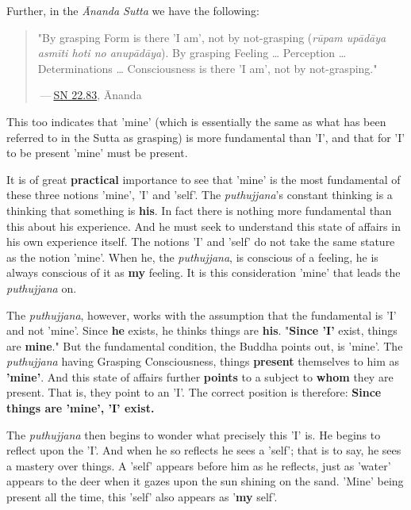 Further, in the \emph{Ānanda Sutta} we have the following:

\begin{quote}
"By grasping Form is there 'I am', not by not-grasping (\emph{rūpam upādāya asmīti hoti no anupādāya}). By grasping Feeling \ldots{} Perception \ldots{} Determinations \ldots{} Consciousness is there 'I am', not by not-grasping."

 --- \href{https://suttacentral.net/sn22.83/en/bodhi}{SN 22.83}, Ānanda
\end{quote}

This too indicates that 'mine' (which is essentially the same as what has been referred to in the Sutta as grasping) is more fundamental than 'I', and that for 'I' to be present 'mine' must be present.

It is of great \textbf{practical} importance to see that 'mine' is the most fundamental of these three notions 'mine', 'I' and 'self'. The \emph{puthujjana}'s constant thinking is a thinking that something is \textbf{his}. In fact there is nothing more fundamental than this about his experience. And he must seek to understand this state of affairs in his own experience itself. The notions 'I' and 'self' do not take the same stature as the notion 'mine'. When he, the \emph{puthujjana}, is conscious of a feeling, he is always conscious of it as \textbf{my} feeling. It is this consideration 'mine' that leads the \emph{puthujjana} on.

The \emph{puthujjana}, however, works with the assumption that the fundamental is 'I' and not 'mine'. Since \textbf{he} exists, he thinks things are \textbf{his}. "\textbf{Since 'I'} exist, things are \textbf{mine}." But the fundamental condition, the Buddha points out, is 'mine'. The \emph{puthujjana} having Grasping Consciousness, things \textbf{present} themselves to him as \textbf{'mine'}. And this state of affairs further \textbf{points} to a subject to \textbf{whom} they are present. That is, they point to an 'I'. The correct position is therefore: \textbf{Since things are 'mine', 'I' exist.}

The \emph{puthujjana} then begins to wonder what precisely this 'I' is. He begins to reflect upon the 'I'. And when he so reflects he sees a 'self'; that is to say, he sees a mastery over things. A 'self' appears before him as he reflects, just as 'water' appears to the deer when it gazes upon the sun shining on the sand. 'Mine' being present all the time, this 'self' also appears as '\textbf{my} self'.

